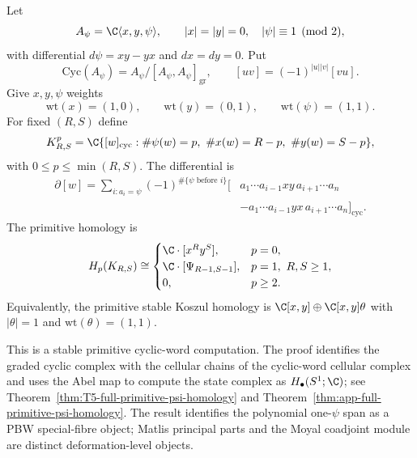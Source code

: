 \documentclass[11pt]{memoir}
\begin{document}
\begin{cor}\label{cor:full-primitive-koszul-homology}
  Let
	  $$A_{\psi}=\C\langle x,y,\psi\rangle,\qquad
	    |x|=|y|=0,\quad |\psi|\equiv1\pmod 2,$$
  with differential $d\psi=xy-yx$ and $dx=dy=0$. Put
  $$\mathrm{Cyc}(A_{\psi})=A_{\psi}/[A_{\psi},A_{\psi}]_{\mathrm{gr}},\qquad
    [uv]=(-1)^{|u||v|}[vu].$$
  Give $x,y,\psi$ weights
  $$\mathrm{wt}(x)=(1,0),\qquad \mathrm{wt}(y)=(0,1),\qquad
    \mathrm{wt}(\psi)=(1,1).$$
  For fixed $(R,S)$ define
  $$K^p_{R,S}=\C\{[w]_{\mathrm{cyc}}:
    \#\psi(w)=p,\ \#x(w)=R-p,\ \#y(w)=S-p\},$$
  with $0\leq p\leq\min(R,S)$. The differential is
  \begin{align*}
  \partial[w]
    =\sum_{i:a_i=\psi}(-1)^{\#\{\psi\text{ before }i\}}
    [&a_1\cdots a_{i-1}xy\,a_{i+1}\cdots a_n\\
     &-a_1\cdots a_{i-1}yx\,a_{i+1}\cdots a_n]_{\mathrm{cyc}}.
  \end{align*}
  The primitive homology is
  $$H_p(K_{R,S})\cong
    \begin{cases}
      \C\cdot[x^Ry^S],&p=0,\\
      \C\cdot[\Psi_{R-1,S-1}],&p=1,\ R,S\geq1,\\
      0,&p\geq2.
    \end{cases}$$
  Equivalently, the primitive stable Koszul homology is
  $\C[x,y]\oplus\C[x,y]\theta$ with $|\theta|=1$ and
  $\mathrm{wt}(\theta)=(1,1)$.

  This is a stable primitive cyclic-word computation.  The
  proof identifies the graded cyclic complex with the cellular chains of
  the cyclic-word cellular complex and uses the Abel map to compute
  the state complex as \(H_\bullet(S^1;\C)\); see
  Theorem~\ref{thm:T5-full-primitive-psi-homology} and
  Theorem~\ref{thm:app-full-primitive-psi-homology}.  The result
  identifies the polynomial one-\(\psi\) span as a PBW special-fibre
  object; Matlis principal parts and the Moyal coadjoint module are
  distinct deformation-level objects.
\end{cor}
\end{document}
